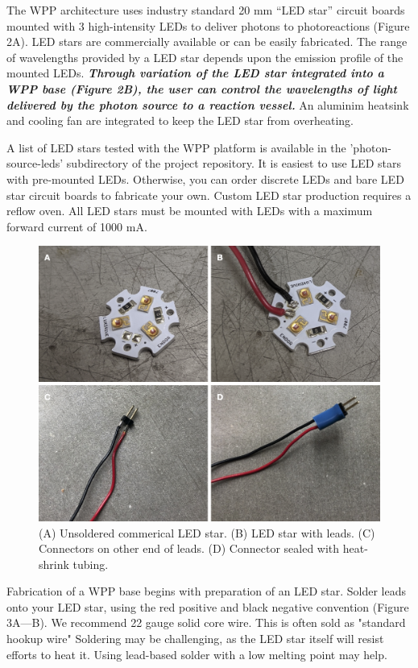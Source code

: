 \documentclass[11pt]{article}
\begin{document}
The WPP architecture uses industry standard 20 mm ``LED star'' circuit boards mounted with 3 high-intensity LEDs to deliver photons to photoreactions (Figure 2A).
LED stars are commercially available or can be easily fabricated.
The range of wavelengths provided by a LED star depends upon the emission profile of the mounted LEDs.
\textbf{\textit{Through variation of the LED star integrated into a WPP base (Figure 2B), the user can control the wavelengths of light delivered by the photon source to a reaction vessel.}}
An aluminim heatsink and cooling fan are integrated to keep the LED star from overheating.

A list of LED stars tested with the WPP platform is available in the 'photon-source-leds' subdirectory of the project repository.
It is easiest to use LED stars with pre-mounted LEDs.
Otherwise, you can order discrete LEDs and bare LED star circuit boards to fabricate your own.
Custom LED star production requires a reflow oven.
All LED stars must be mounted with LEDs with a maximum forward current of 1000 mA.

\begin{figure}[H]
	\includegraphics[width=\textwidth]{"./fig3.png"}
	\caption{(A) Unsoldered commerical LED star. (B) LED star with leads. (C) Connectors on other end of leads. (D) Connector sealed with heat-shrink tubing.}
\end{figure}

Fabrication of a WPP base begins with preparation of an LED star.
Solder leads onto your LED star, using the red positive and black negative convention (Figure 3A---B).
We recommend 22 gauge solid core wire.
This is often sold as "standard hookup wire"
Soldering may be challenging, as the LED star itself will resist efforts to heat it.
Using lead-based solder with a low melting point may help.
\end{document}
